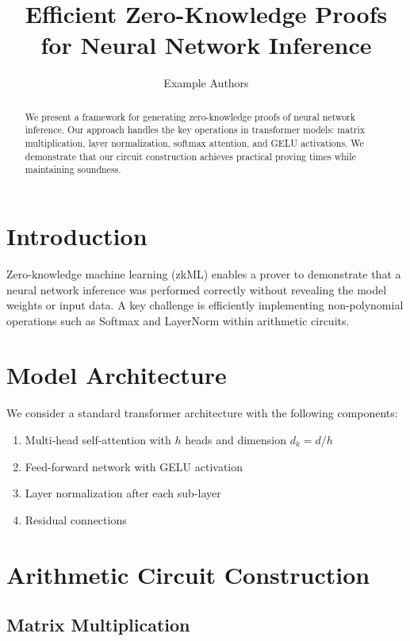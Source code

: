 \documentclass{article}
\title{Efficient Zero-Knowledge Proofs for Neural Network Inference}
\author{Example Authors}
\begin{document}
\maketitle

\begin{abstract}
We present a framework for generating zero-knowledge proofs of neural network inference.
Our approach handles the key operations in transformer models: matrix multiplication,
layer normalization, softmax attention, and GELU activations. We demonstrate that our
circuit construction achieves practical proving times while maintaining soundness.
\end{abstract}

\section{Introduction}

Zero-knowledge machine learning (zkML) enables a prover to demonstrate that a neural
network inference was performed correctly without revealing the model weights or input
data. A key challenge is efficiently implementing non-polynomial operations such as
Softmax and LayerNorm within arithmetic circuits.

\section{Model Architecture}

We consider a standard transformer architecture with the following components:

\begin{enumerate}
    \item Multi-head self-attention with $h$ heads and dimension $d_k = d/h$
    \item Feed-forward network with GELU activation
    \item Layer normalization after each sub-layer
    \item Residual connections
\end{enumerate}

\section{Arithmetic Circuit Construction}

\subsection{Matrix Multiplication}
\end{document}
